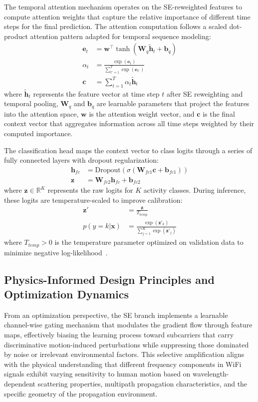 \documentclass[journal]{IEEEtran}
\begin{document}
The temporal attention mechanism operates on the SE-reweighted features to compute attention weights that capture the relative importance of different time steps for the final prediction. The attention computation follows a scaled dot-product attention pattern adapted for temporal sequence modeling:
\begin{align}
\mathbf{e}_t &= \mathbf{w}^\top \tanh(\mathbf{W}_q \tilde{\mathbf{h}}_t + \mathbf{b}_q) \\
\alpha_t &= \frac{\exp(\mathbf{e}_t)}{\sum_{t'=1}^{T} \exp(\mathbf{e}_{t'})} \\
\mathbf{c} &= \sum_{t=1}^{T} \alpha_t \tilde{\mathbf{h}}_t
\end{align}
where $\tilde{\mathbf{h}}_t$ represents the feature vector at time step $t$ after SE reweighting and temporal pooling, $\mathbf{W}_q$ and $\mathbf{b}_q$ are learnable parameters that project the features into the attention space, $\mathbf{w}$ is the attention weight vector, and $\mathbf{c}$ is the final context vector that aggregates information across all time steps weighted by their computed importance.

The classification head maps the context vector to class logits through a series of fully connected layers with dropout regularization:
\begin{align}
\mathbf{h}_{fc} &= \mathrm{Dropout}(\sigma(\mathbf{W}_{fc1} \mathbf{c} + \mathbf{b}_{fc1})) \\
\mathbf{z} &= \mathbf{W}_{fc2} \mathbf{h}_{fc} + \mathbf{b}_{fc2}
\end{align}
where $\mathbf{z} \in \mathbb{R}^K$ represents the raw logits for $K$ activity classes. During inference, these logits are temperature-scaled to improve calibration:
\begin{align}
\mathbf{z}' &= \frac{\mathbf{z}}{T_{temp}} \\
p(y = k | \mathbf{x}) &= \frac{\exp(\mathbf{z}'_k)}{\sum_{j=1}^{K} \exp(\mathbf{z}'_j)}
\end{align}
where $T_{temp} > 0$ is the temperature parameter optimized on validation data to minimize negative log-likelihood~\cite{calibration_guo2017}.

\subsection{Physics-Informed Design Principles and Optimization Dynamics}

From an optimization perspective, the SE branch implements a learnable channel-wise gating mechanism that modulates the gradient flow through feature maps, effectively biasing the learning process toward subcarriers that carry discriminative motion-induced perturbations while suppressing those dominated by noise or irrelevant environmental factors. This selective amplification aligns with the physical understanding that different frequency components in WiFi signals exhibit varying sensitivity to human motion based on wavelength-dependent scattering properties, multipath propagation characteristics, and the specific geometry of the propagation environment.
\end{document}
